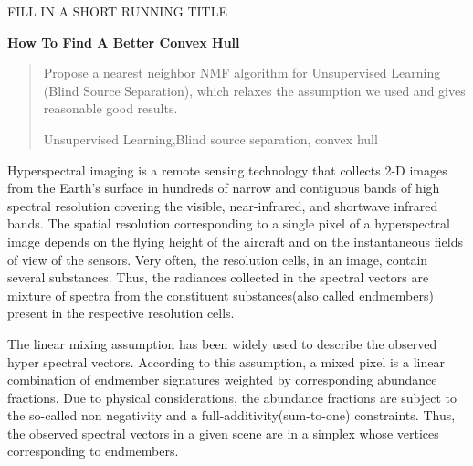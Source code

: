 \documentclass[14pt]{book}
\begin{document}
\renewcommand{\baselinestretch}{1.2}
\markright{
}
{\hfill {\footnotesize\rm FILL IN A SHORT RUNNING TITLE} \hfill}
\renewcommand{\thefootnote}{}
$\ $\par
\fontsize{10.95}{14pt plus.8pt minus .6pt}\selectfont
\vspace{0.8pc}
\centerline{\large\bf How To Find A Better Convex Hull}
\vspace{2pt}
\centerline{\large\bf }
\vspace{.55cm}
\fontsize{9}{11.5pt plus.8pt minus .6pt}\selectfont


\begin{quotation}
Propose a nearest neighbor NMF algorithm for Unsupervised Learning (Blind Source Separation), which relaxes the assumption we used and gives reasonable good results.  \par

\vspace{9pt}
Unsupervised Learning,Blind source separation, convex hull
\par
\end{quotation}\par

\fontsize{10.95}{14pt plus.8pt minus .6pt}\selectfont
\setcounter{chapter}{1}
\setcounter{equation}{0} %
Hyperspectral imaging is a remote sensing technology that collects 2-D images from the Earth's surface in hundreds of narrow and contiguous bands of high spectral resolution covering the visible, near-infrared, and shortwave infrared bands. The spatial resolution corresponding to a single pixel of a hyperspectral image depends on the flying height of the aircraft and on the instantaneous fields of view of the sensors. Very often, the resolution cells, in an image, contain several substances. Thus, the radiances collected in the spectral vectors are mixture of spectra from the constituent substances(also called endmembers) present in the respective resolution cells. 
\par The linear mixing assumption has been widely used to describe the observed hyper spectral vectors. According to this assumption, a mixed pixel is a linear combination of endmember signatures weighted by corresponding abundance fractions. Due to physical considerations, the abundance fractions are subject to the so-called non negativity and a full-additivity(sum-to-one) constraints. Thus, the observed spectral vectors in a given scene are in a simplex whose vertices corresponding to endmembers.
\end{document}
